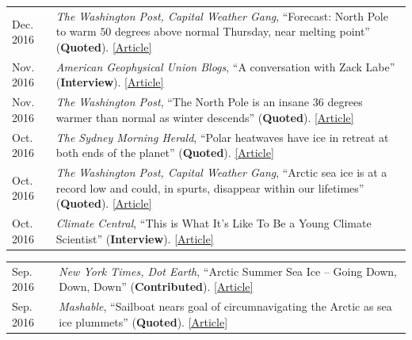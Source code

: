 \documentclass[margin,line,palatino,courier,10pt]{res}
\begin{document}
\begin{resume}
\begin{tabular}{@{}p{0.9in}p{4in}}
Dec. 2016 & \textit{The Washington Post, Capital Weather Gang}, ``Forecast: North Pole to warm $50$ degrees above normal Thursday, near melting point'' (\textbf{Quoted}). \href{https://www.washingtonpost.com/news/capital-weather-gang/wp/2016/12/20/forecast-north-pole-to-warm-50-degrees-above-normal-thursday-near-melting-point/?dfgdfgdfgdfg&utm_term=.e648369ada7e}{[Article]}\\
Nov. 2016 & \textit{American Geophysical Union Blogs}, ``A conversation with Zack Labe'' (\textbf{Interview}). \href{http://blogs.agu.org/mountainbeltway/2016/11/23/conversation-zack-labe/}{[Article]}\\
Nov. 2016 & \textit{The Washington Post}, ``The North Pole is an insane 36 degrees warmer than normal as winter descends'' (\textbf{Quoted}). \href{https://www.washingtonpost.com/news/energy-environment/wp/2016/11/17/the-north-pole-is-an-insane-36-degrees-warmer-than-normal-as-winter-descends/?utm_term=.f2cb9596b3d8}{[Article]}\\
Oct. 2016 & \textit{The Sydney Morning Herald}, ``Polar heatwaves have ice in retreat at both ends of the planet'' (\textbf{Quoted}). \href{http://www.smh.com.au/environment/climate-change/polar-heatwaves-have-ice-in-retreat-at-both-ends-of-the-planet-20161030-gse9q6.html}{[Article]}\\
Oct. 2016 & \textit{The Washington Post, Capital Weather Gang}, ``Arctic sea ice is at a record low and could, in spurts, disappear within our lifetimes'' (\textbf{Quoted}). \href{https://www.washingtonpost.com/news/capital-weather-gang/wp/2016/10/27/arctic-sea-ice-is-at-a-record-low-and-could-in-spurts-disappear-within-our-lifetimes/}{[Article]}\\
Oct. 2016 & \textit{Climate Central}, ``This is What It's Like To Be a Young Climate Scientist'' (\textbf{Interview}). \href{http://www.climatecentral.org/news/young-climate-scientists-interviews-20799}{[Article]}\\
\end{tabular}
\begin{tabular}{@{}p{0.9in}p{4in}}
Sep. 2016 & \textit{New York Times, Dot Earth}, ``Arctic Summer Sea Ice -- Going Down, Down, Down'' (\textbf{Contributed}). \href{http://dotearth.blogs.nytimes.com/2016/09/16/arctic-summer-sea-ice-going-down-down-down/?module=BlogPost-ReadMore&version=Blog\%20Main&action=Click&contentCollection=arctic&pgtype=Blogs&region=Body&_r=1#more-58318}{[Article]}\\
Sep. 2016 & \textit{Mashable}, ``Sailboat nears goal of circumnavigating the Arctic as sea ice plummets'' (\textbf{Quoted}). \href{http://mashable.com/2016/09/01/sailboat-arctic-ice-melt-open-water/#s7nzft8m6sqB}{[Article]}\\

\end{tabular}
\end{resume}
\end{document}
